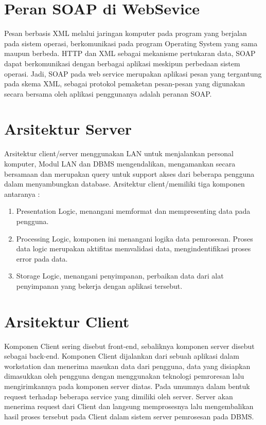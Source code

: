 \section{Peran SOAP di WebSevice}
Pesan berbasis XML melalui jaringan komputer pada program yang berjalan pada sistem operasi, berkomunikasi pada program Operating 
System yang sama maupun berbeda. 
HTTP dan XML sebagai mekanisme pertukaran data, SOAP dapat berkomunikasi dengan berbagai aplikasi meskipun perbedaan sistem operasi. 
Jadi, SOAP pada web service merupakan aplikasi pesan yang tergantung pada skema XML, sebagai protokol pemaketan pesan-pesan yang digunakan 
secara bersama oleh aplikasi penggunanya adalah peranan SOAP.

\section{Arsitektur Server}
Arsitektur client/server menggunakan LAN untuk menjalankan personal komputer, Modul LAN dan DBMS mengendalikan, mengamankan secara 
bersamaan dan merupakan query untuk support akses dari beberapa pengguna dalam menyambungkan database.
Arsitektur client/memiliki tiga komponen antaranya :
\begin{enumerate}
\item Presentation Logic, menangani memformat dan mempresenting data pada pengguna.
\item Processing Logic, komponen ini menangani logika data pemrosesan. Proses data logic merupakan aktifitas memvalidasi data, 
mengindentifikasi proses error pada data.
\item Storage Logic, menangani penyimpanan, perbaikan data dari alat penyimpanan yang bekerja dengan aplikasi tersebut.
\end{enumerate}

\section{Arsitektur Client}
Komponen Client sering disebut front-end, sebaliknya komponen server disebut sebagai back-end. 
Komponen Client dijalankan dari sebuah aplikasi dalam workstation dan menerima masukan data dari pengguna, data yang disiapkan 
dimasukkan oleh pengguna dengan menggunakan teknologi pemroresan lalu mengirimkannya pada komponen server diatas. 
Pada umumnya dalam bentuk request terhadap beberapa service yang dimiliki oleh server. 
Server akan menerima request dari Client dan langsung memprosesnya lalu mengembalikan hasil proses tersebut pada Client dalam sistem 
server pemrosesan pada DBMS.

